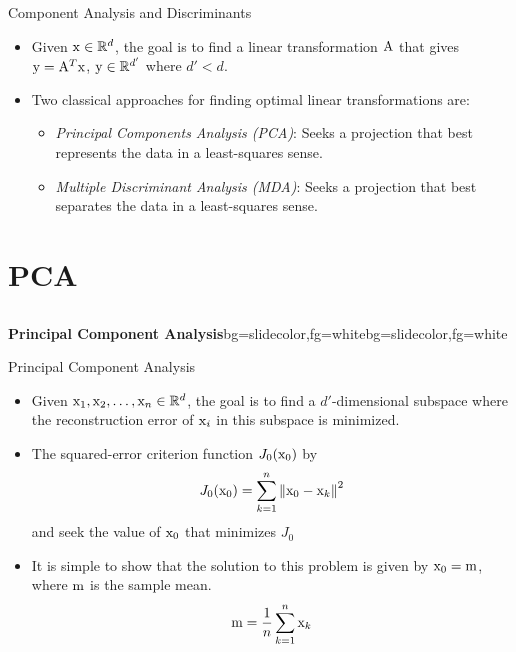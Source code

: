 \begin{frame}{Component Analysis and Discriminants}
\begin{itemize}
\setlength{\itemsep}{12pt}
\item Given ${\rm x}\in \mathbb{R}^d$, the goal is to find a linear transformation ${\rm A}$ that gives ${\rm y} = {\rm A}^T{\rm x}$, ${\rm y}\in \mathbb{R}^{d'}$ where $d' < d$.
\vspace{1cm}
\item Two classical approaches for finding optimal linear
transformations are:
\begin{itemize}
\setlength{\itemsep}{8pt}
\item \textit{\color{mycolor2}Principal Components Analysis (PCA)}: Seeks a projection that best represents the data in a least-squares sense.
\item \textit{\color{mycolor2}Multiple Discriminant Analysis (MDA)}: Seeks a projection that
best separates the data in a least-squares sense.
\end{itemize}
\end{itemize}
\end{frame}

\section{PCA}
\subsection{}

\begin{frame}{}
\begin{variableblock}{\centering \Large \textbf{\vspace{4pt}\newline Principal Component Analysis\vspace{4pt}}}{bg=slidecolor,fg=white}{bg=slidecolor,fg=white}
\end{variableblock}
\end{frame}

\begin{frame}{Principal Component Analysis}
\begin{itemize}
\item Given ${\rm x}_1,{\rm x}_2,\ldots,{\rm x}_n\in \mathbb{R}^d$, the goal is to find a $d'$-dimensional subspace where the reconstruction error of ${\rm x}_i$ in this subspace is minimized.
\item The squared-error criterion function $J_0({\rm x}_0)$ by
\begin{equation}
{J_0}({{\rm x}_0}) = \sum\limits_{k = 1}^n {{{\left\| {{{\rm x}_0} - {{\rm x}_k}} \right\|}^2}} \nonumber
\end{equation}
and seek the value of ${\rm x}_0$ that minimizes $J_0$
\item It is simple to show that the solution to this problem is given by ${\rm x}_0={\rm m}$, where ${\rm m}$ is the sample mean.
\begin{equation}
{\rm m} = \frac{1}{n}\sum\limits_{k = 1}^n {{{\rm x}_k}}\nonumber
\end{equation}
\end{itemize}
\end{frame}


